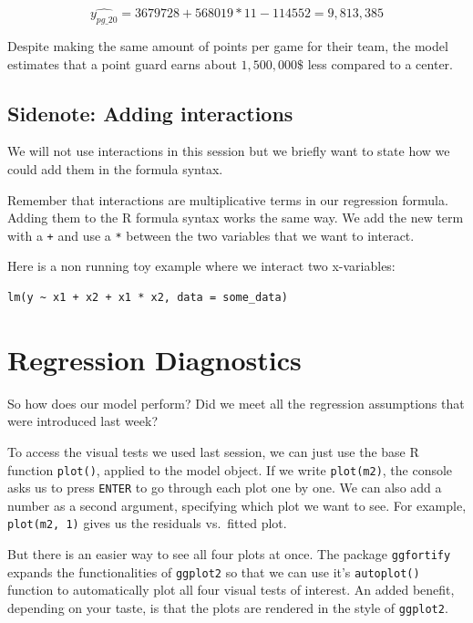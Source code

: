 \documentclass[
]{book}
\begin{document}
\[\hat{y_{pg\_20}} = 3679728 + 568019 * 11 - 114552 = 9,813,385\]

Despite making the same amount of points per game for their team, the model
estimates that a point guard earns about \(1,500,000\$\) less compared to a center.

\hypertarget{sidenote-adding-interactions}{%
\subsection{Sidenote: Adding interactions}\label{sidenote-adding-interactions}}

We will not use interactions in this session but we briefly want to state how we
could add them in the formula syntax.

Remember that interactions are multiplicative terms in our regression formula.
Adding them to the R formula syntax works the same way. We add the new term with
a \texttt{+} and use a \texttt{*} between the two variables that we want to interact.

Here is a non running toy example where we interact two x-variables:

\begin{verbatim}
lm(y ~ x1 + x2 + x1 * x2, data = some_data)
\end{verbatim}

\hypertarget{regression-diagnostics-1}{%
\section{Regression Diagnostics}\label{regression-diagnostics-1}}

So how does our model perform? Did we meet all the regression assumptions that
were introduced last week?

To access the visual tests we used last session, we can just use the base R
function \texttt{plot()}, applied to the model object. If we write \texttt{plot(m2)}, the
console asks us to press \texttt{ENTER} to go through each plot one by one. We can also
add a number as a second argument, specifying which plot we want to see. For
example, \texttt{plot(m2,\ 1)} gives us the residuals vs.~fitted plot.

But there is an easier way to see all four plots at once. The package
\texttt{ggfortify} expands the functionalities of \texttt{ggplot2} so that we can use it's
\texttt{autoplot()} function to automatically plot all four visual tests of interest.
An added benefit, depending on your taste, is that the plots are rendered in the
style of \texttt{ggplot2}.
\end{document}
